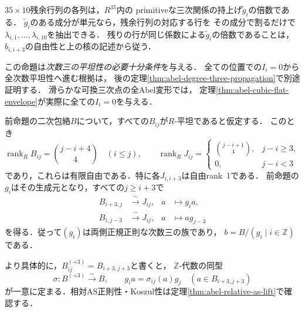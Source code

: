 \begin{remark}[計算上の抽出と論理的な範囲]
$35\times10$残余行列の各列は，$R^{35}$内の
primitiveな三次関係の持上げ$\widetilde g_i$の倍数である．
$\widetilde g_i$のある成分が単元なら，残余行列の対応する行を
その成分で割るだけで$\lambda_{i,1},\ldots,\lambda_{i,10}$を抽出できる．
残りの行が同じ係数による$\widetilde g_i$の倍数であることは，
$b_{i,i+3}$の自由性と上の核の記述から従う．

この命題は\emph{次数三の平坦性の必要十分条件}を与える．
全ての位置での$I_i=0$から全次数平坦性へ進む根拠は，
後の定理\ref{thm:abel-degree-three-propagation}で別途証明する．
滑らかな可換三次点の全Abel変形では，
定理\ref{thm:abel-cubic-flat-envelope}が実際に全ての$I_i=0$を与える．
\end{remark}

\begin{proposition}[二次包絡の平坦性から正規正則三次族へ]
\label{prop:abel-flat-envelope-normal-cubic}
前命題の二次包絡$B$について，すべての$B_{ij}$が$R$-平坦であると仮定する．
このとき
\[
 \operatorname{rank}_R B_{ij}=\binom{j-i+4}{4}\quad(i\leq j),
 \qquad
 \operatorname{rank}_R J_{ij}=
 \begin{cases}
  \binom{j-i+1}{4},&j-i\geq3,\\
  0,&j-i<3
 \end{cases}
\]
であり，これらは有限自由である．特に各$J_{i,i+3}$は自由rank~1である．
前命題の$g_i$はその生成元となり，すべての$j\geq i+3$で
\[
 \begin{aligned}
 B_{i+3,j}&\xrightarrow{\ \sim\ }J_{ij},& a&\longmapsto g_i a,\\
 B_{i,j-3}&\xrightarrow{\ \sim\ }J_{ij},& a&\longmapsto a g_{j-3}
 \end{aligned}
\]
を得る．従って$(g_i)$は両側正規正則な次数三の族であり，
$b=B/(g_i\mid i\in\mathbb Z)$である．

より具体的に，$B^{(+3)}_{ij}=B_{i+3,j+3}$と書くと，
$\mathbb Z$-代数の同型
\[
 \sigma:B^{(+3)}\xrightarrow{\sim}B,
 \qquad g_i a=\sigma_{ij}(a)g_j
 \quad(a\in B_{i+3,j+3})
\]
が一意に定まる．相対AS正則性・Koszul性は定理\ref{thm:abel-relative-as-lift}で確認する．
\end{proposition}

